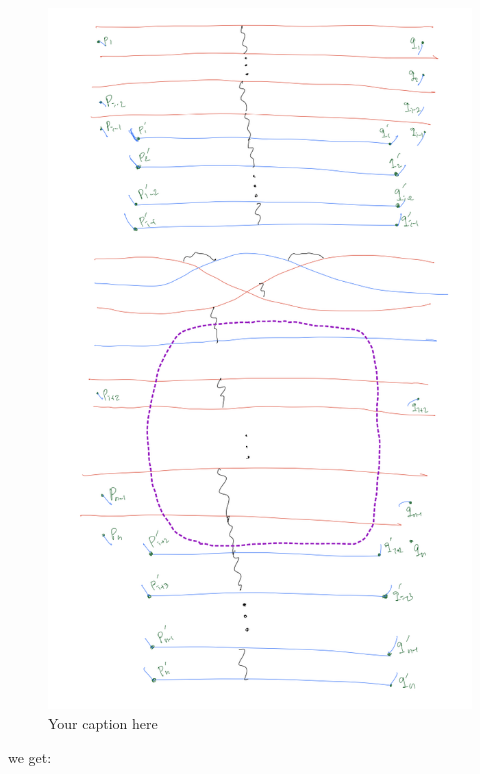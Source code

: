 \begin{figure}[H] %
    \centering
    \includegraphics[width=\linewidth]{diagrams/definition12/9.png} %
    \caption{Your caption here}
    \label{fig:your-label}
\end{figure}

we get:

